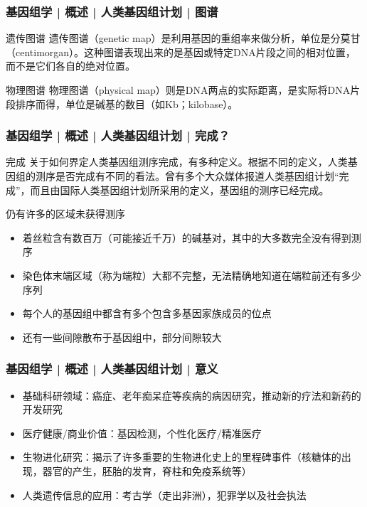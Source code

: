 \begin{frame}
  \frametitle{基因组学 | 概述 | 人类基因组计划 | 图谱}
  \begin{block}{遗传图谱}
遗传图谱（genetic map）是利用基因的重组率来做分析，单位是分莫甘（centimorgan）。这种图谱表现出来的是基因或特定DNA片段之间的相对位置，而不是它们各自的绝对位置。
  \end{block}
  \pause
  \begin{block}{物理图谱}
物理图谱（physical map）则是DNA两点的实际距离，是实际将DNA片段排序而得，单位是碱基的数目（如Kb；kilobase）。
  \end{block}
\end{frame}

\begin{frame}
  \frametitle{基因组学 | 概述 | 人类基因组计划 | 完成？}
  \begin{block}{完成}
关于如何界定人类基因组测序完成，有多种定义。根据不同的定义，人类基因组的测序是否完成有不同的看法。曾有多个大众媒体报道人类基因组计划“完成”，而且由国际人类基因组计划所采用的定义，基因组的测序已经完成。
  \end{block}
  \pause
  \begin{block}{仍有许多的区域未获得测序}
    \begin{itemize}
      \item 着丝粒含有数百万（可能接近千万）的碱基对，其中的大多数完全没有得到测序
      \item 染色体末端区域（称为端粒）大都不完整，无法精确地知道在端粒前还有多少序列
      \item 每个人的基因组中都含有多个包含多基因家族成员的位点
      \item 还有一些间隙散布于基因组中，部分间隙较大
    \end{itemize}
  \end{block}
\end{frame}

\begin{frame}
  \frametitle{基因组学 | 概述 | 人类基因组计划 | 意义}
  \begin{itemize}
    \item 基础科研领域：癌症、老年痴呆症等疾病的病因研究，推动新的疗法和新药的开发研究
    \item 医疗健康/商业价值：基因检测，个性化医疗/精准医疗
    \item 生物进化研究：揭示了许多重要的生物进化史上的里程碑事件（核糖体的出现，器官的产生，胚胎的发育，脊柱和免疫系统等）
    \item 人类遗传信息的应用：考古学（走出非洲），犯罪学以及社会执法
  \end{itemize}
\end{frame}

